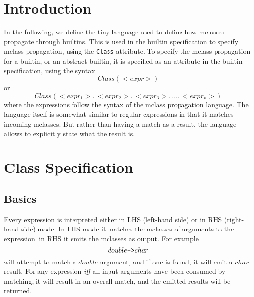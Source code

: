 

\section{ Introduction }
In the following, we define the tiny language used to define how
mclasses propagate through builtins. This is used in the builtin specification
to specify mclass propagation, using the {\tt Class} attribute. To specify the
mclass propagation for a builtin, or an abstract builtin, it is
specified as an attribute in the builtin specification, using the syntax
\begin{equation*}
  Class(<expr>)
\end{equation*}
or
\begin{equation*}
  Class(<expr_1>,<expr_2>,<expr_3>,\ldots,<expr_n>)
\end{equation*}
where the expressions follow the syntax of the mclass propagation
language. 
The language itself is somewhat similar to regular
expressions in that it matches incoming mclasses. But rather than
having a match as a result, the language allows to
explicitly state what the result is.



\section{ Class Specification }

\subsection{Basics}
Every expression is interpreted either in LHS (left-hand side) or in RHS
(right-hand side) mode. In LHS mode it matches the mclasses of
arguments to the expression, in RHS it emits the mclasses as
output. For example
\begin{equation*}
double \text{{\tt ->}} char
\end{equation*}
will attempt to match a $double$ argument, and if one is found, it
will emit a $char$ result. For any expression \emph{iff} all input arguments
have been consumed by matching, it will result in an overall match,
and the emitted results will be returned.

